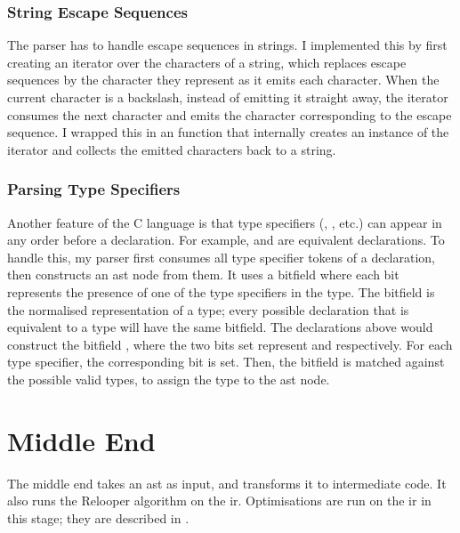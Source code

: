 \documentclass[00-main.tex]{subfiles}
\begin{document}
\subsubsection{String Escape Sequences}

The parser has to handle escape sequences in strings.
I implemented this by first creating an iterator over the characters of a string, which replaces escape sequences by the character they represent as it emits each character.
When the current character is a backslash, instead of emitting it straight away, the iterator consumes the next character and emits the character corresponding to the escape sequence.
I wrapped this in an  function that internally creates an instance of the iterator and collects the emitted characters back to a string.

\subsubsection{Parsing Type Specifiers}

Another feature of the C language is that type specifiers (, , etc.) can appear in any order before a declaration.
For example,  and  are equivalent declarations.
To handle this, my parser first consumes all type specifier tokens of a declaration, then constructs an  \gls{ast} node from them.
It uses a bitfield where each bit represents the presence of one of the type specifiers in the type.
The bitfield is the normalised representation of a type; every possible declaration that is equivalent to a type will have the same bitfield.
The declarations above would construct the bitfield , where the two bits set represent  and  respectively.
For each type specifier, the corresponding bit is set.
Then, the bitfield is matched against the possible valid types, to assign the type to the \gls{ast} node.


\section{Middle End}

The middle end takes an \gls{ast} as input, and transforms it to intermediate code.
It also runs the Relooper algorithm on the \gls{ir}.
Optimisations are run on the \gls{ir} in this stage; they are described in .
\end{document}
